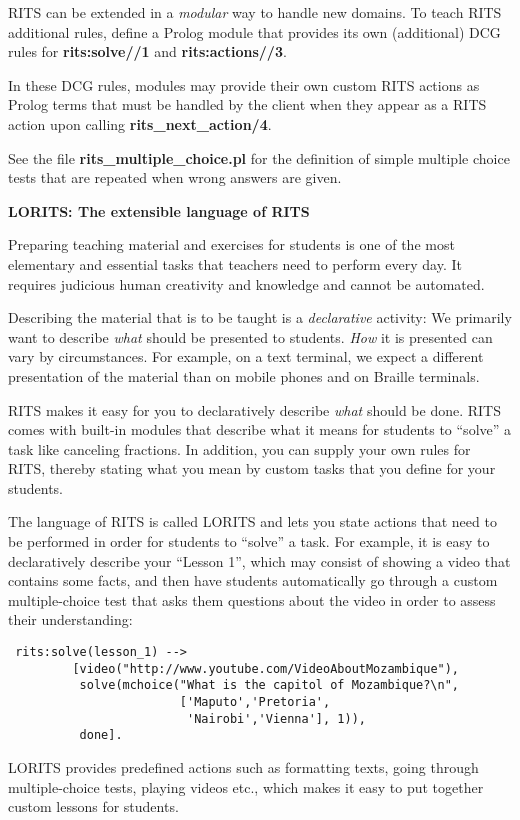 \documentclass[a4paper,11pt]{article}
\begin{document}
RITS can be extended in a \textit{modular} way to handle new domains.
To teach RITS additional rules, define a Prolog module that provides
its own (additional) DCG rules for \textbf{rits:solve//1} and
\textbf{rits:actions//3}. 

In these DCG rules, modules may provide their own custom RITS actions
as Prolog terms that must be handled by the client when they appear as
a RITS action upon calling \textbf{rits\_next\_action/4}.

See the file \textbf{rits\_multiple\_choice.pl} for the definition of
simple multiple choice tests that are repeated when wrong answers are
given.

\bigskip
\begin{center}
  \large\textbf{LORITS: The extensible language of RITS}
\end{center}

\medskip
\noindent
Preparing teaching material and exercises for students is one of the
most elementary and essential tasks that teachers need to perform
every day. It requires judicious human creativity and knowledge and
cannot be automated.

Describing the material that is to be taught is a \textit{declarative}
activity: We primarily want to describe \textit{what} should be
presented to students. \textit{How} it is presented can vary by
circumstances. For example, on a text terminal, we expect a different
presentation of the material than on mobile phones and on Braille
terminals.

RITS makes it easy for you to declaratively describe \textit{what}
should be done. RITS comes with built-in modules that describe what it
means for students to ``solve'' a task like canceling fractions. In
addition, you can supply your own rules for RITS, thereby stating what
you mean by custom tasks that you define for your students.

The language of RITS is called LORITS and lets you state actions that
need to be performed in order for students to ``solve'' a task. For
example, it is easy to declaratively describe your ``Lesson 1'', which
may consist of showing a video that contains some facts, and then have
students automatically go through a custom multiple-choice test that
asks them questions about the video in order to assess their
understanding:

\begin{verbatim}
 rits:solve(lesson_1) -->
         [video("http://www.youtube.com/VideoAboutMozambique"),
          solve(mchoice("What is the capitol of Mozambique?\n",
                        ['Maputo','Pretoria',
                         'Nairobi','Vienna'], 1)),
          done].
\end{verbatim}

LORITS provides predefined actions such as formatting texts, going
through multiple-choice tests, playing videos etc., which makes it
easy to put together custom lessons for students.

\vfil
\end{document}
